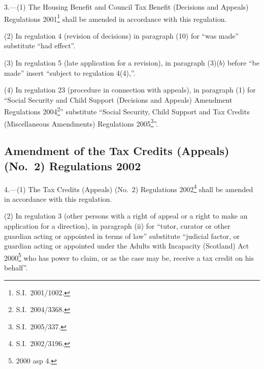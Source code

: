 \documentclass[12pt,a4paper]{article}
\begin{document}
3.---(1)  The Housing Benefit and Council Tax Benefit (Decisions and Appeals) Regulations 2001\footnote{S.I.\ 2001/1002.} shall be amended in accordance with this regulation.

(2) In regulation 4 (revision of decisions) in paragraph (10) for “was made” substitute “had effect”.

(3) In regulation 5 (late application for a revision), in paragraph (3)($b$)  before “be made” insert “subject to regulation 4(4),”.

(4) In regulation 23 (procedure in connection with appeals), in paragraph (1) for “Social Security and Child Support (Decisions and Appeals) Amendment Regulations 2004\footnote{S.I.\ 2004/3368.}” substitute “Social Security, Child Support and Tax Credits (Miscellaneous Amendments) Regulations 2005\footnote{S.I.\ 2005/337.}”.

\subsection[4. Amendment of the Tax Credits (Appeals) (No.\ 2) Regulations 2002]{Amendment of the Tax Credits (Appeals) (No.\ 2) Regulations 2002}

4.---(1)  The Tax Credits (Appeals) (No.\ 2) Regulations 2002\footnote{S.I.\ 2002/3196.} shall be amended in accordance with this regulation.

(2) In regulation 3 (other persons with a right of appeal or a right to make an application for a direction), in paragraph (ii)  for “tutor, curator or other guardian acting or appointed in terms of law” substitute “judicial factor, or guardian acting or appointed under the Adults with Incapacity (Scotland) Act 2000\footnote{2000 asp 4.} who has power to claim, or as the case may be, receive a tax credit on his behalf”.
\end{document}
